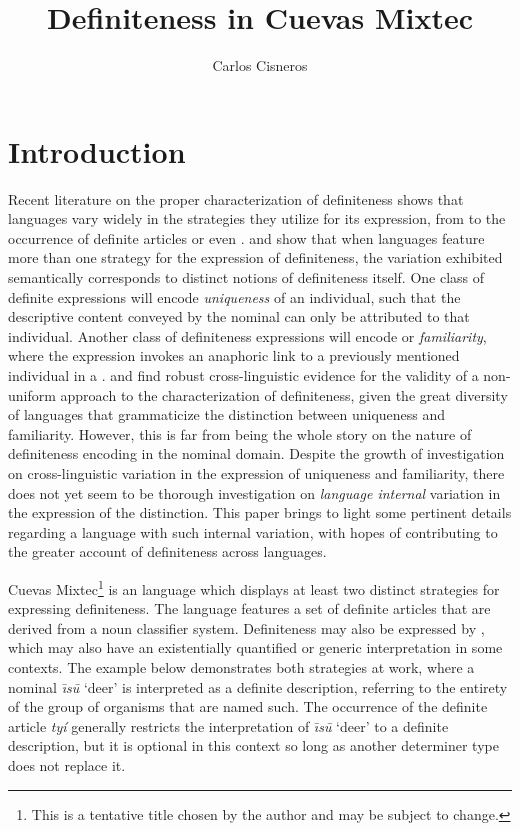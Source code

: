\documentclass[output=paper,modfonts,nonflat]{langsci/langscibook}
\title{Definiteness in Cuevas Mixtec}
\author{%
 Carlos Cisneros\affiliation{University of Chicago}
}
\begin{document}
\maketitle

\section{Introduction} \label{sec:cisneros:1}

Recent literature on the proper characterization of definiteness shows that languages vary widely in the strategies they utilize for its expression, from  to the occurrence of definite articles or even .  \citet{Schwarz2009} and \citet{Jenks2015} show that when languages feature more than one strategy for the expression of definiteness, the variation exhibited semantically corresponds to distinct notions of definiteness itself.  One class of definite expressions will encode \textit{uniqueness} of an individual, such that the descriptive content conveyed by the nominal can only be attributed to that individual.  Another class of definiteness expressions will encode  or \textit{familiarity}, where the expression invokes an anaphoric link to a previously mentioned individual in a .  \citeauthor{Schwarz2009} and \citeauthor{Jenks2015} find robust cross-linguistic evidence for the validity of a non-uniform approach to the characterization of definiteness, given the great diversity of languages that grammaticize the distinction between uniqueness and familiarity.  However, this is far from being the whole story on the nature of definiteness encoding in the nominal domain.  Despite the growth of investigation on cross-linguistic variation in the expression of uniqueness and familiarity, there does not yet seem to be thorough investigation on \textit{language internal} variation in the expression of the distinction.  This paper brings to light some pertinent details regarding a language with such internal variation, with hopes of contributing to the greater account of definiteness across languages.

Cuevas Mixtec\footnote{This is a tentative title chosen by the author and may be subject to change.} is an  language which displays at least two distinct strategies for expressing definiteness.  The language features a set of definite articles that are derived from a noun classifier system.  Definiteness may also be expressed by , which may also have an existentially quantified or generic interpretation in some contexts.  The example below demonstrates both strategies at work, where a nominal \textit{\=\i s\=u} `deer' is interpreted as a definite description, referring to the entirety of the group of organisms that are named such.  The occurrence of the definite article \textit{ty\'i} generally restricts the interpretation of \textit{\=\i s\=u} `deer' to a definite description, but it is optional in this context so long as another determiner type does not replace it.
\end{document}
